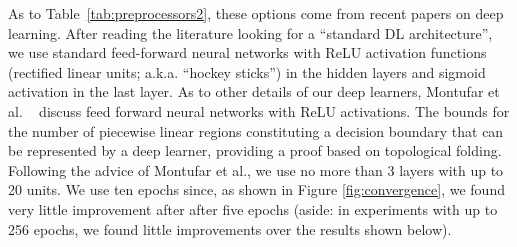 \documentclass[10pt,compsoc,twocolumn]{IEEEtran}
\begin{document}
As to Table~\ref{tab:preprocessors2}, these options come from recent papers on deep learning.
After reading the literature looking for a ``standard DL architecture'', we 
use standard feed-forward neural networks with ReLU activation functions (rectified linear units; a.k.a. ``hockey sticks'') in the hidden layers and sigmoid activation in the last layer.
As to other details of our deep learners, 
 Montufar et al. ~\cite{montufar2014number} discuss   feed forward neural networks with ReLU activations.
 The bounds for the number of piecewise linear regions constituting a decision boundary that can be represented by a deep learner, providing a proof based on topological folding.  Following the advice of   Montufar et al.,  we use no more than 3 layers with up to 20 units.
 We use ten epochs since,   as shown in Figure \ref{fig:convergence}, we found very little improvement after  after five epochs
 (aside:   in experiments with up to 256 epochs, we found little improvements over the results shown below).
 



  
 
 
\end{document}
